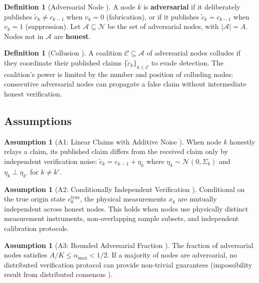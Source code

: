 \documentclass[11pt,a4paper]{article}
\theoremstyle{definition}
\newtheorem{definition}[theorem]{Definition}
\newtheorem{assumption}[theorem]{Assumption}
\theoremstyle{remark}
\newcommand{\nodeSet}{\mathcal{N}}
\begin{document}
\begin{definition}[Adversarial Node ]
\label{def:adversarial}
A node $k$ is \textbf{adversarial} if it deliberately publishes $\tilde{c}_k \neq c_{k-1}$ when $v_k = 0$ (fabrication), or if it publishes $\tilde{c}_k = c_{k-1}$ when $v_k = 1$ (suppression). Let $\mathcal{A} \subseteq \nodeSet$ be the set of adversarial nodes, with $|\mathcal{A}| = A$. Nodes not in $\mathcal{A}$ are \textbf{honest}.
\end{definition}

\begin{definition}[Collusion ]
\label{def:collusion}
A coalition $\mathcal{C} \subseteq \mathcal{A}$ of adversarial nodes colludes if they coordinate their published claims $\{\tilde{c}_k\}_{k \in \mathcal{C}}$ to evade detection. The coalition's power is limited by the number and position of colluding nodes: consecutive adversarial nodes can propagate a false claim without intermediate honest verification.
\end{definition}

\subsection{Assumptions }

\begin{assumption}[A1: Linear Claims with Additive Noise ]
\label{ass:A1}
When node $k$ honestly relays a claim, its published claim differs from the received claim only by independent verification noise: $\tilde{c}_k = c_{k-1} + \eta_k$ where $\eta_k \sim \mathcal{N}(0, \Sigma_k)$ and $\eta_k \perp \eta_{k'}$ for $k \neq k'$.
\end{assumption}

\begin{assumption}[A2: Conditionally Independent Verification ]
\label{ass:A2}
Conditional on the true origin state $c_0^{\text{true}}$, the physical measurements $x_k$ are mutually independent across honest nodes. This holds when nodes use physically distinct measurement instruments, non-overlapping sample subsets, and independent calibration protocols.
\end{assumption}

\begin{assumption}[A3: Bounded Adversarial Fraction ]
\label{ass:A3}
The fraction of adversarial nodes satisfies $A/K \leq \alpha_{\max} < 1/2$. If a majority of nodes are adversarial, no distributed verification protocol can provide non-trivial guarantees (impossibility result from distributed consensus \cite{lamport1982byzantine}).
\end{assumption}
\end{document}
